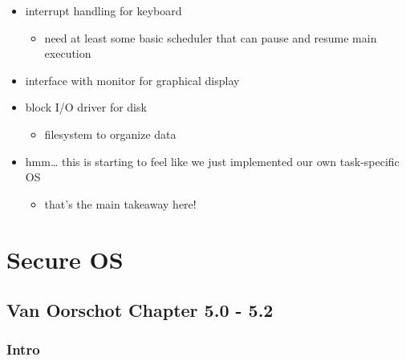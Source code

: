 \documentclass[
  12pt]{findlay}
\providecommand{\tightlist}{%
  \setlength{\itemsep}{0pt}\setlength{\parskip}{0pt}}
\begin{document}
\begin{itemize}
\tightlist
\item
  interrupt handling for keyboard

  \begin{itemize}
  \tightlist
  \item
    need at least some basic scheduler that can pause and resume main
    execution
  \end{itemize}
\item
  interface with monitor for graphical display
\item
  block I/O driver for disk

  \begin{itemize}
  \tightlist
  \item
    filesystem to organize data
  \end{itemize}
\item
  hmm\ldots{} this is starting to feel like we just implemented our own
  task-specific OS

  \begin{itemize}
  \tightlist
  \item
    that's the main takeaway here!
  \end{itemize}
\end{itemize}

\hypertarget{secure-os}{%
\section{Secure OS}\label{secure-os}}

\hypertarget{van-oorschot-chapter-5.0---5.2}{%
\subsection{Van Oorschot Chapter 5.0 -
5.2}\label{van-oorschot-chapter-5.0---5.2}}

\hypertarget{intro}{%
\subsubsection{Intro}\label{intro}}
\end{document}
